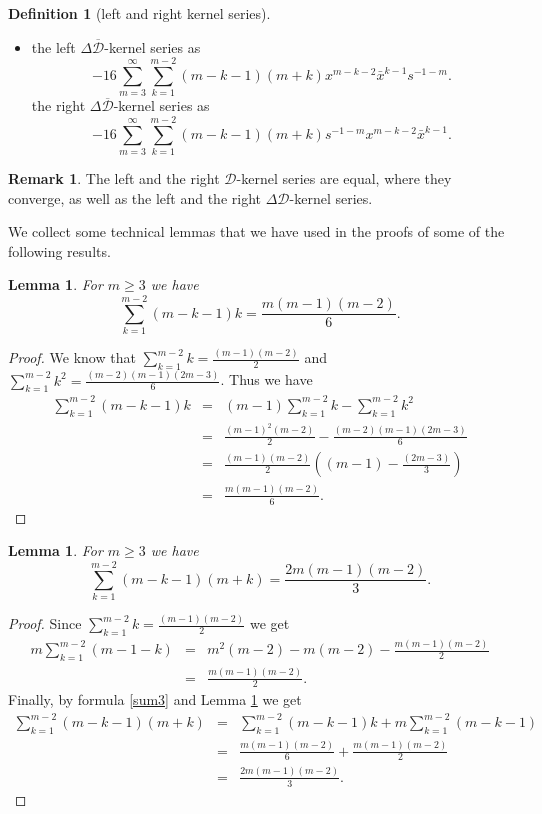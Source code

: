 \documentclass[reqno,11pt]{amsart}
\numberwithin{equation}{section}
\newtheorem{lemma}[theorem]{Lemma}
\theoremstyle{definition}
\newtheorem{remark}[theorem]{{\bf Remark}}
\newtheorem{definition}[theorem]{Definition}
\begin{document}
\begin{definition}[left and right kernel series]
\begin{itemize}
\begin{equation}
\end{equation}
the right $ \mathcal{\overline{D}}^2$-kernel series as
$$4 \left[\sum_{m=2}^\infty s^{-1-m} \left(m(m-1)x^{m-2}+2  \sum_{k=1}^{m-1} (2m-k)x^{m-k-1}\bar{x}^{k-1}\right)  \right],$$
\item the left $ \Delta \mathcal{\overline{D}}$-kernel series as
\begin{equation}
-16 \sum_{m=3}^\infty \sum_{k=1}^{m-2} (m-k-1)(m+k)x^{m-k-2} \bar{x}^{k-1}s^{-1-m}.
\end{equation}
the right $ \Delta \mathcal{\overline{D}}$-kernel series as
$$-16 \sum_{m=3}^\infty \sum_{k=1}^{m-2} (m-k-1)(m+k)s^{-1-m}x^{m-k-2} \bar{x}^{k-1}.$$
\end{itemize}
\end{definition}



\begin{remark}
The left and the right $ \mathcal{D}$-kernel series are equal, where they converge, as well as the left and the right $ \Delta \mathcal{D}$-kernel series.
\end{remark}

We collect some technical lemmas that we have used in the proofs of some of the following results.
\begin{lemma}
\label{sum}
For $ m \geq 3$ we have
$$ \sum_{k=1}^{m-2} (m-k-1)k= \frac{m(m-1)(m-2)}{6}.$$
\end{lemma}
\begin{proof}
We know that $ \sum_{k=1}^{m-2}k= \frac{(m-1)(m-2)}{2}$ and $ \sum_{k=1}^{m-2} k^2= \frac{(m-2)(m-1)(2m-3)}{6}$. Thus we have
\begin{eqnarray*}
\sum_{k=1}^{m-2} (m-k-1)k &=& (m-1)\sum_{k=1}^{m-2}k-\sum_{k=1}^{m-2} k^2\\
&=& \frac{(m-1)^2(m-2)}{2}- \frac{(m-2)(m-1)(2m-3)}{6}\\
&=& \frac{(m-1)(m-2)}{2} \left((m-1)- \frac{(2m-3)}{3}\right)\\
&=& \frac{m(m-1)(m-2)}{6}.
\end{eqnarray*}
\end{proof}
\begin{lemma}
\label{sum2}
For $ m \geq 3$ we have
$$ \sum_{k=1}^{m-2}(m-k-1)(m+k)= \frac{2m(m-1)(m-2)}{3}.$$
\end{lemma}
\begin{proof}
Since $ \sum_{k=1}^{m-2}k= \frac{(m-1)(m-2)}{2}$ we get
\begin{eqnarray}
\nonumber
m \sum_{k=1}^{m-2} (m-1-k)&=&m^2(m-2)-m(m-2)- \frac{m(m-1)(m-2)}{2}\\
\label{sum3}
&=& \frac{m(m-1)(m-2)}{2}.
\end{eqnarray}
Finally, by formula \eqref{sum3} and Lemma \ref{sum} we get
\begin{eqnarray*}
\sum_{k=1}^{m-2}(m-k-1)(m+k)&=& \sum_{k=1}^{m-2}(m-k-1)k +m\sum_{k=1}^{m-2}(m-k-1)\\
&=& \frac{m(m-1)(m-2)}{6}+\frac{m(m-1)(m-2)}{2}\\
&=& \frac{2m(m-1)(m-2)}{3}.
\end{eqnarray*}
\end{proof}
\end{document}
